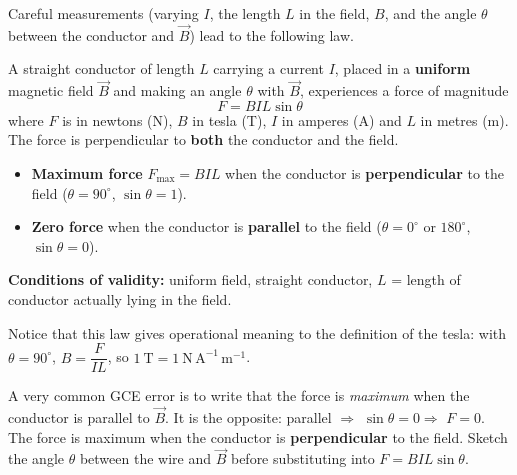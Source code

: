 \documentclass[11pt]{article}
\begin{document}
Careful measurements (varying $I$, the length $L$ in the field, $B$, and the angle $\theta$ between the conductor and $\vec{B}$) lead to the following law.

\begin{propriete}
A straight conductor of length $L$ carrying a current $I$, placed in a \textbf{uniform} magnetic field $\vec{B}$ and making an angle $\theta$ with $\vec{B}$, experiences a force of magnitude
\[
\boxed{\,F = BIL\sin\theta\,}
\]
where $F$ is in newtons (N), $B$ in tesla (T), $I$ in amperes (A) and $L$ in metres (m). The force is perpendicular to \textbf{both} the conductor and the field.
\begin{itemize}
\item \textbf{Maximum force} $F_{\max} = BIL$ when the conductor is \textbf{perpendicular} to the field ($\theta = 90^{\circ}$, $\sin\theta = 1$).
\item \textbf{Zero force} when the conductor is \textbf{parallel} to the field ($\theta = 0^{\circ}$ or $180^{\circ}$, $\sin\theta = 0$).
\end{itemize}
\textbf{Conditions of validity:} uniform field, straight conductor, $L$ = length of conductor actually lying in the field.
\end{propriete}

Notice that this law gives operational meaning to the definition of the tesla: with $\theta = 90^{\circ}$, $B = \dfrac{F}{IL}$, so $1\ \mathrm{T} = 1\ \mathrm{N\,A^{-1}\,m^{-1}}$.

\begin{attention}
A very common GCE error is to write that the force is \emph{maximum} when the conductor is parallel to $\vec{B}$. It is the opposite: parallel $\Rightarrow$ $\sin\theta = 0 \Rightarrow$ $F = 0$. The force is maximum when the conductor is \textbf{perpendicular} to the field. Sketch the angle $\theta$ between the wire and $\vec{B}$ before substituting into $F = BIL\sin\theta$.
\end{attention}
\end{document}
